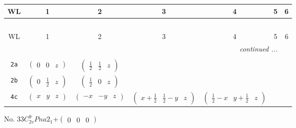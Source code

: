 \documentclass[fleqn,9pt,landscape]{jsarticle}
\begin{document}
\begin{center}
\renewcommand{\arraystretch}{1.2}
\begin{longtable}{ccccccc}
 \hline \hline
WL & 1 & 2 & 3 & 4 & 5 & 6 \\ \hline \endfirsthead

\multicolumn{6}{l}{\tablename\ \thetable{}} \\
 \hline \hline
WL & 1 & 2 & 3 & 4 & 5 & 6 \\ \hline \endhead

 \hline \hline
\multicolumn{6}{r}{\footnotesize\it continued ...} \\ \endfoot

 \hline \hline
\multicolumn{6}{r}{} \\ \endlastfoot

{\tt 2a} & $ \begin{pmatrix} 0 & 0 & z \end{pmatrix} $ & $ \begin{pmatrix} \frac{1}{2} & \frac{1}{2} & z \end{pmatrix} $ & $  $ & $  $ \\ \hline
{\tt 2b} & $ \begin{pmatrix} 0 & \frac{1}{2} & z \end{pmatrix} $ & $ \begin{pmatrix} \frac{1}{2} & 0 & z \end{pmatrix} $ & $  $ & $  $ \\ \hline
{\tt 4c} & $ \begin{pmatrix} x & y & z \end{pmatrix} $ & $ \begin{pmatrix} - x & - y & z \end{pmatrix} $ & $ \begin{pmatrix} x + \frac{1}{2} & \frac{1}{2} - y & z \end{pmatrix} $ & $ \begin{pmatrix} \frac{1}{2} - x & y + \frac{1}{2} & z \end{pmatrix} $ \\
\end{longtable}
\end{center}
\newpage
No. 33\quad$C_{2v}^{9}$\quad$Pna2_1$\quad[ orthorhombic ]\quad$+\begin{pmatrix} 0 & 0 & 0 \end{pmatrix}$
\end{document}
